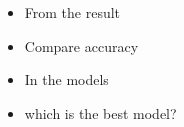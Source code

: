 \begin{itemize}
    \item From the result
    \item Compare accuracy
    \item In the models
    \item which is the best model?
\end{itemize}